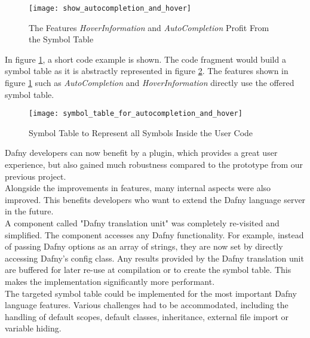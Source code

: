 \begin{figure}[H]
    \centering
    \texttt{[image: show\_autocompletion\_and\_hover]}
    \caption{The Features \textit{HoverInformation} and \textit{AutoCompletion} Profit From the Symbol Table}
    \label{fig:show_autocompletion_and_hover}
\end{figure}

In figure \ref{fig:show_autocompletion_and_hover}, a short code example is shown.
The code fragment would build a symbol table as it is abstractly represented in figure \ref{fig:symbol_table_for_autocompletion_and_hover}.
The features shown in figure \ref{fig:show_autocompletion_and_hover} such as \textit{AutoCompletion} and \textit{HoverInformation} directly use the offered symbol table.

\begin{figure}[H]
    \centering
    \texttt{[image: symbol\_table\_for\_autocompletion\_and\_hover]}
    \caption{Symbol Table to Represent all Symbols Inside the User Code}
    \label{fig:symbol_table_for_autocompletion_and_hover}
\end{figure}

Dafny developers can now benefit by a plugin, which provides a great user experience,
but also gained much robustness compared to the prototype from our previous project.\\

Alongside the improvements in features, many internal aspects were also improved.
This benefits developers who want to extend the Dafny language server in the future.\\

A component called "Dafny translation unit" was completely re-visited and simplified.
The component accesses any Dafny functionality.
For example, instead of passing Dafny options as an array of strings, they are now set by
directly accessing Dafny's config class.
Any results provided by the Dafny translation unit are buffered for later re-use at compilation or to create the symbol table.
This makes the implementation significantly more performant.\\

The targeted symbol table could be implemented for the most important Dafny language features.
Various challenges had to be accommodated, including the handling of default scopes, default classes, inheritance, external file import or variable hiding.\\

